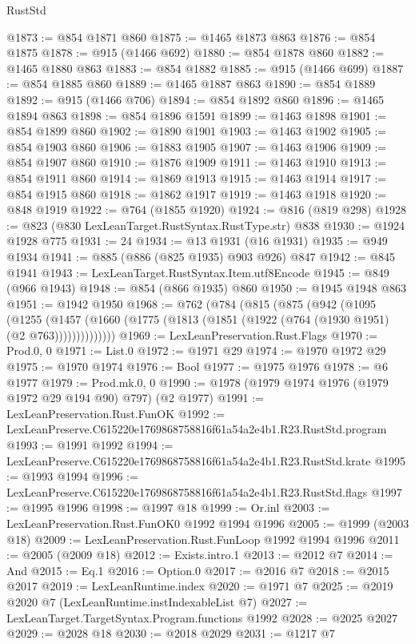 \begin{lexlean}{RustStd}
\begin{coremodule}
@1873 := @854 @1871 @860
@1875 := @1465 @1873 @863
@1876 := @854 @1875
@1878 := @915 (@1466 @692)
@1880 := @854 @1878 @860
@1882 := @1465 @1880 @863
@1883 := @854 @1882
@1885 := @915 (@1466 @699)
@1887 := @854 @1885 @860
@1889 := @1465 @1887 @863
@1890 := @854 @1889
@1892 := @915 (@1466 @706)
@1894 := @854 @1892 @860
@1896 := @1465 @1894 @863
@1898 := @854 @1896 @1591
@1899 := @1463 @1898
@1901 := @854 @1899 @860
@1902 := @1890 @1901
@1903 := @1463 @1902
@1905 := @854 @1903 @860
@1906 := @1883 @1905
@1907 := @1463 @1906
@1909 := @854 @1907 @860
@1910 := @1876 @1909
@1911 := @1463 @1910
@1913 := @854 @1911 @860
@1914 := @1869 @1913
@1915 := @1463 @1914
@1917 := @854 @1915 @860
@1918 := @1862 @1917
@1919 := @1463 @1918
@1920 := @848 @1919
@1922 := @764 (@1855 @1920)
@1924 := @816 (@819 @298)
@1928 := @823 (@830 LexLeanTarget.RustSyntax.RustType.str) @838
@1930 := @1924 @1928 @775
@1931 := 24
@1934 := @13 @1931 (@16 @1931)
@1935 := @949 @1934
@1941 := @885 (@886 (@825 @1935) @903 @926) @847
@1942 := @845 @1941
@1943 := LexLeanTarget.RustSyntax.Item.utf8Encode
@1945 := @849 (@966 @1943)
@1948 := @854 (@866 @1935) @860
@1950 := @1945 @1948 @863
@1951 := @1942 @1950
@1968 := @762
    (@784
      (@815
        (@875
          (@942
            (@1095
              (@1255
                (@1457 (@1660 (@1775 (@1813 (@1851 (@1922 (@764 (@1930 @1951) (@2 @763))))))))))))))
@1969 := LexLeanPreservation.Rust.Flags
@1970 := Prod.{0, 0}
@1971 := List.{0}
@1972 := @1971 @29
@1974 := @1970 @1972 @29
@1975 := @1970 @1974
@1976 := Bool
@1977 := @1975 @1976
@1978 := @6 @1977
@1979 := Prod.mk.{0, 0}
@1990 := @1978 (@1979 @1974 @1976 (@1979 @1972 @29 @194 @90) @797) (@2 @1977)
@1991 := LexLeanPreservation.Rust.FunOK
@1992 := LexLeanPreserve.C615220e1769868758816f61a54a2e4b1.R23.RustStd.program
@1993 := @1991 @1992
@1994 := LexLeanPreserve.C615220e1769868758816f61a54a2e4b1.R23.RustStd.krate
@1995 := @1993 @1994
@1996 := LexLeanPreserve.C615220e1769868758816f61a54a2e4b1.R23.RustStd.flags
@1997 := @1995 @1996
@1998 := @1997 @18
@1999 := Or.inl
@2003 := LexLeanPreservation.Rust.FunOK0 @1992 @1994 @1996
@2005 := @1999 (@2003 @18)
@2009 := LexLeanPreservation.Rust.FunLoop @1992 @1994 @1996
@2011 := @2005 (@2009 @18)
@2012 := Exists.intro.{1}
@2013 := @2012 @7
@2014 := And
@2015 := Eq.{1}
@2016 := Option.{0}
@2017 := @2016 @7
@2018 := @2015 @2017
@2019 := LexLeanRuntime.index
@2020 := @1971 @7
@2025 := @2019 @2020 @7 (LexLeanRuntime.instIndexableList @7)
@2027 := LexLeanTarget.TargetSyntax.Program.functions @1992
@2028 := @2025 @2027
@2029 := @2028 @18
@2030 := @2018 @2029
@2031 := @1217 @7

\end{coremodule}
\end{lexlean}
